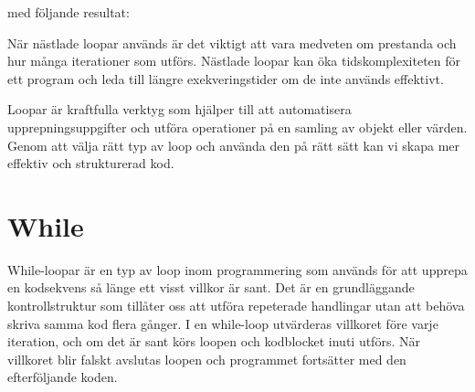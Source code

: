 med följande resultat:

\hypertarget{cb4}{}
\begin{Shaded}
\begin{Highlighting}[]
\OperatorTok{:} \OperatorTok{,}\OperatorTok{:} 
\OperatorTok{:} \OperatorTok{,}\OperatorTok{:} 
\OperatorTok{:} \OperatorTok{,}\OperatorTok{:} 
\OperatorTok{:} \OperatorTok{,}\OperatorTok{:} 
\OperatorTok{:} \OperatorTok{,}\OperatorTok{:} 
\OperatorTok{:} \OperatorTok{,}\OperatorTok{:} 
\OperatorTok{:} \OperatorTok{,}\OperatorTok{:} 
\OperatorTok{:} \OperatorTok{,}\OperatorTok{:} 
\OperatorTok{:} \OperatorTok{,}\OperatorTok{:} 
\end{Highlighting}
\end{Shaded}

När nästlade loopar används är det viktigt att vara medveten om
prestanda och hur många iterationer som utförs. Nästlade loopar kan öka
tidskomplexiteten för ett program och leda till längre exekveringstider
om de inte används effektivt.

Loopar är kraftfulla verktyg som hjälper till att automatisera
upprepningsuppgifter och utföra operationer på en samling av objekt
eller värden. Genom att välja rätt typ av loop och använda den på rätt
sätt kan vi skapa mer effektiv och strukturerad kod.

\hypertarget{while}{%
\section{While}\label{while}}

While-loopar är en typ av loop inom programmering som används för att
upprepa en kodsekvens så länge ett visst villkor är sant. Det är en
grundläggande kontrollstruktur som tillåter oss att utföra repeterade
handlingar utan att behöva skriva samma kod flera gånger. I en
while-loop utvärderas villkoret före varje iteration, och om det är sant
körs loopen och kodblocket inuti utförs. När villkoret blir falskt
avslutas loopen och programmet fortsätter med den efterföljande koden.

